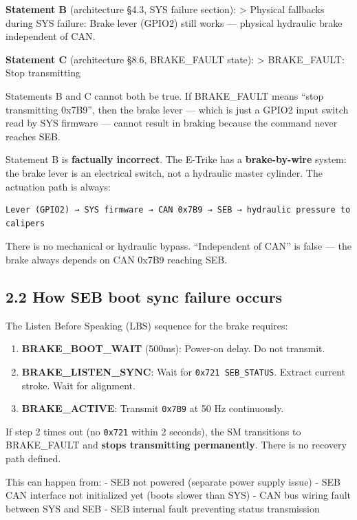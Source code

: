\documentclass[12pt,a4paper,oneside]{report}
\providecommand{\tightlist}{\setlength{\itemsep}{0pt}\setlength{\parskip}{0pt}}
\begin{document}
\textbf{Statement B} (architecture §4.3, SYS failure section): \textgreater{}
Physical fallbacks during SYS failure: Brake lever (GPIO2) still works ---
physical hydraulic brake independent of CAN.

\textbf{Statement C} (architecture §8.6, BRAKE\_FAULT state): \textgreater{}
BRAKE\_FAULT: Stop transmitting

Statements B and C cannot both be true. If BRAKE\_FAULT means ``stop
transmitting 0x7B9'', then the brake lever --- which is just a GPIO2 input
switch read by SYS firmware --- cannot result in braking because the command
never reaches SEB.

Statement B is \textbf{factually incorrect}. The E-Trike has a
\textbf{brake-by-wire} system: the brake lever is an electrical switch, not a
hydraulic master cylinder. The actuation path is always:

\begin{verbatim}
Lever (GPIO2) → SYS firmware → CAN 0x7B9 → SEB → hydraulic pressure to calipers
\end{verbatim}

There is no mechanical or hydraulic bypass. ``Independent of CAN'' is false ---
the brake always depends on CAN 0x7B9 reaching SEB.

\subsection{2.2 How SEB boot sync failure
occurs}\label{how-seb-boot-sync-failure-occurs}

The Listen Before Speaking (LBS) sequence for the brake requires:

\begin{enumerate}
\def\labelenumi{\arabic{enumi}.}
\tightlist
\item
  \textbf{BRAKE\_BOOT\_WAIT} (500ms): Power-on delay. Do not transmit.
\item
  \textbf{BRAKE\_LISTEN\_SYNC}: Wait for \texttt{0x721\ SEB\_STATUS}. Extract
  current stroke. Wait for alignment.
\item
  \textbf{BRAKE\_ACTIVE}: Transmit \texttt{0x7B9} at 50 Hz continuously.
\end{enumerate}

If step 2 times out (no \texttt{0x721} within 2 seconds), the SM transitions to
BRAKE\_FAULT and \textbf{stops transmitting permanently}. There is no recovery
path defined.

This can happen from: - SEB not powered (separate power supply issue) - SEB CAN
interface not initialized yet (boots slower than SYS) - CAN bus wiring fault
between SYS and SEB - SEB internal fault preventing status transmission
\end{document}
